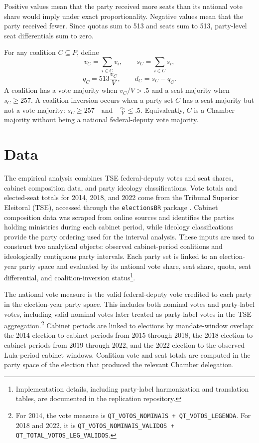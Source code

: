 \documentclass[11pt]{article}
\newcommand{\Quota}{q}
\newcommand{\Diff}{d}
\newcommand{\Parties}{P}
\begin{document}
Positive values mean that the party received more seats than its national vote
share would imply under exact proportionality. Negative values mean that the
party received fewer. Since quotas sum to 513 and seats sum to 513, party-level
seat differentials sum to zero.

For any coalition $C \subseteq \Parties$, define
\[
  v_C = \sum_{i\in C} v_i, \qquad s_C = \sum_{i\in C} s_i,
\]
\[
  \Quota_C = 513\frac{v_C}{V}, \qquad \Diff_C = s_C - \Quota_C.
\]
A coalition has a vote majority when $v_C/V > .5$ and a seat majority when
$s_C \geq 257$. A coalition inversion occurs when a party set $C$ has a seat majority but not a vote majority: \(s_C \geq 257 \quad \text{and} \quad \frac{v_C}{V} \leq .5.\)
Equivalently, $C$ is a Chamber majority without being a national federal-deputy
vote majority.


\section{Data}
\label{sec:data}

The empirical analysis combines TSE federal-deputy votes and seat shares, cabinet
composition data, and party ideology classifications. Vote totals and
elected-seat totals for 2014, 2018, and 2022 come from the Tribunal Superior
Eleitoral (TSE), accessed through the \texttt{electionsBR} package
\parencite{electionsbr}. Cabinet composition data was scraped from online sources and identifies the parties holding
ministries during each cabinet period, while ideology classifications provide the
party ordering used for the interval analysis. These inputs are used to construct two analytical objects: observed
cabinet-period coalitions and ideologically contiguous party intervals. Each
party set is linked to an election-year party space and evaluated by its national
vote share, seat share, quota, seat differential, and coalition-inversion status\footnote{Implementation details, including party-label harmonization and translation
tables, are documented in the replication repository.}.

The national vote measure is the valid federal-deputy vote credited to each
party in the election-year party space. This includes both nominal votes and
party-label votes, including valid nominal votes later treated as party-label
votes in the TSE aggregation.\footnote{For 2014, the vote measure is
\texttt{QT\_VOTOS\_NOMINAIS + QT\_VOTOS\_LEGENDA}. For 2018 and 2022, it is
\texttt{QT\_VOTOS\_NOMINAIS\_VALIDOS + QT\_TOTAL\_VOTOS\_LEG\_VALIDOS}.} Cabinet
periods are linked to elections by mandate-window overlap: the 2014 election to
cabinet periods from 2015 through 2018, the 2018 election to cabinet periods
from 2019 through 2022, and the 2022 election to the observed Lula-period
cabinet windows. Coalition vote and seat totals are computed in the party space
of the election that produced the relevant Chamber delegation.
\end{document}
